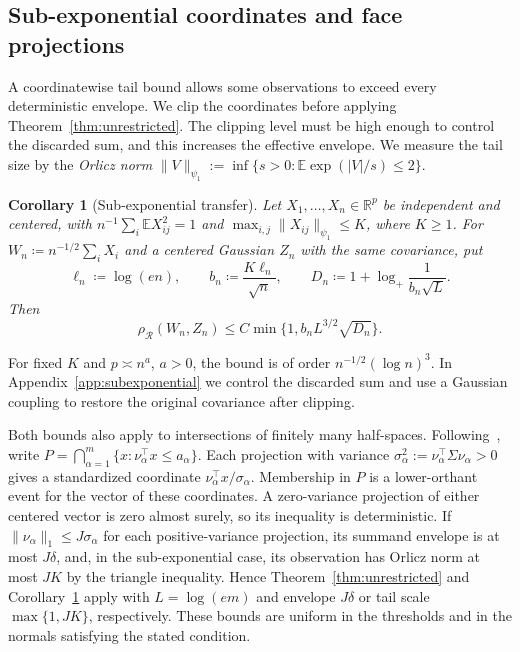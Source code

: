 \documentclass[11pt,letterpaper]{article}
\newtheorem{corollary}{Corollary}
\theoremstyle{remark}
\newcommand{\E}{\mathbb E}
\newcommand{\R}{\mathbb R}
\newcommand{\rh}{\rho_{\mathcal R}}
\begin{document}
\subsection{Sub-exponential coordinates and face projections}\label{sec:subexponential}
A coordinatewise tail bound allows some observations to exceed every
deterministic envelope. We clip the coordinates before applying
Theorem~\ref{thm:unrestricted}. The clipping level must be high enough
to control the discarded sum, and this increases the effective envelope.
We measure the tail size by the \emph{Orlicz norm}
\(\|V\|_{\psi_1}:=\inf\{s>0:\E\exp(|V|/s)\le2\}\).

\begin{corollary}[Sub-exponential transfer]\label{cor:subexponential}
Let \(X_1,\ldots,X_n\in\R^p\) be independent and centered, with
\(n^{-1}\sum_i\E X_{ij}^2=1\) and
\(\max_{i,j}\|X_{ij}\|_{\psi_1}\le K\), where \(K\ge1\).
For \(W_n\coloneqq n^{-1/2}\sum_iX_i\) and a centered Gaussian \(Z_n\)
with the same covariance, put
\[
 \ell_n\coloneqq \log(en),\qquad b_n\coloneqq \frac{K\ell_n}{\sqrt n},\qquad
 D_n\coloneqq 1+\log_+\frac1{b_n\sqrt L}.
\]
Then
\begin{equation}
 \rh(W_n,Z_n)\le C\min\{1,b_nL^{3/2}\sqrt{D_n}\}.
 \label{eq:subexponential}
\end{equation}

\end{corollary}

For fixed \(K\) and \(p\asymp n^a\), \(a>0\), the bound is of order
\(n^{-1/2}(\log n)^3\). In Appendix~\ref{app:subexponential} we
control the discarded sum and use a Gaussian coupling to restore
the original covariance after clipping.

Both bounds also apply to intersections of finitely many half-spaces.
Following~\cite[Section~3.1]{CCK2017}, write \(P=\bigcap_{\alpha=1}^m
\{x:\nu_\alpha^\top x\le a_\alpha\}\). Each projection with variance
\(\sigma_\alpha^2:=\nu_\alpha^\top\Sigma\nu_\alpha>0\) gives a standardized
coordinate \(\nu_\alpha^\top x/\sigma_\alpha\). Membership in \(P\) is a
lower-orthant event for the vector of these coordinates. A zero-variance
projection of either centered vector is zero almost surely, so its
inequality is deterministic. If \(\|\nu_\alpha\|_1\le J\sigma_\alpha\)
for each positive-variance projection, its summand envelope is at most
\(J\delta\), and, in the sub-exponential case, its observation has Orlicz
norm at most \(JK\) by the triangle inequality. Hence
Theorem~\ref{thm:unrestricted} and Corollary~\ref{cor:subexponential}
apply with \(L=\log(em)\) and envelope \(J\delta\) or tail scale
\(\max\{1,JK\}\), respectively. These bounds are uniform in the
thresholds and in the normals satisfying the stated condition.
\end{document}
